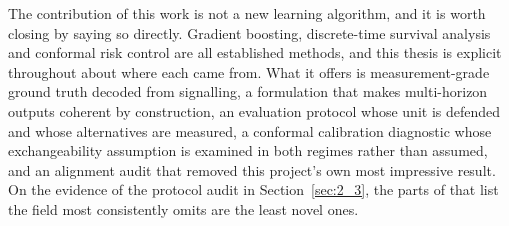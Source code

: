 The contribution of this work is not a new learning algorithm, and it is worth closing by saying so directly. Gradient boosting, discrete-time survival analysis and conformal risk control are all established methods, and this thesis is explicit throughout about where each came from. What it offers is measurement-grade ground truth decoded from signalling, a formulation that makes multi-horizon outputs coherent by construction, an evaluation protocol whose unit is defended and whose alternatives are measured, a conformal calibration diagnostic whose exchangeability assumption is examined in both regimes rather than assumed, and an alignment audit that removed this project's own most impressive result. On the evidence of the protocol audit in Section~\ref{sec:2_3}, the parts of that list the field most consistently omits are the least novel ones.

